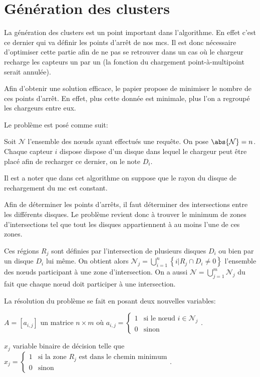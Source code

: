 \documentclass[final]{polytech/polytech}
\begin{document}
	\section{Génération des clusters\label{sec:clustering}}
		La génération des clusters est un point important dans l'algorithme.
		En effet c'est ce dernier qui va définir les points d'arrêt de nos \glspl{mc}.
		Il est donc nécessaire d'optimiser cette partie afin de ne pas se retrouver dans un cas où le chargeur recharge les capteurs un par un (la fonction du chargement point-à-multipoint serait annulée).
		
		Afin d'obtenir une solution efficace, le papier \cite{KHELLADI201744} propose de minimiser le nombre de ces points d'arrêt.
		 En effet, plus cette donnée est minimale, plus l'on a regroupé les chargeurs entre eux.
		 
		 Le problème est posé comme suit:
		 
		 Soit $\mathcal N$ l'ensemble des n\oe uds ayant effectués une requête. On pose $\abs{\mathcal N} = n$.
		 Chaque capteur $i$ dispose dispose d'un disque dans lequel le chargeur peut être placé afin de recharger ce dernier, on le note $D_i$.
		 
		 Il est a noter que dans cet algorithme on suppose que le rayon du disque de rechargement du \gls{mc} est constant.
		 
		 Afin de déterminer les points d'arrêts, il faut déterminer des intersections entre les différents disques.
		 Le problème revient donc à trouver le minimum de zones d'intersections tel que tout les disques appartiennent à au moins l'une de ces zones.
		 
		 Ces régions $R_j$ sont définies par l'intersection de plusieurs disques $D_i$ ou bien par un disque $D_i$ lui même.
		 On obtient alors $\mathcal N_j=\bigcup_{i=1}^n\left\{i|R_j\cap D_i\neq 0\right\}$ l'ensemble des n\oe uds participant à une zone d'intersection.
		 On a aussi $\mathcal N=\bigcup_{j=1}^m\mathcal N_j$ du fait que chaque n\oe ud doit participer à une intersection.
		 
		 La résolution du problème se fait en posant deux nouvelles variables:
		 
		 $A=\left[a_{i,j}\right]$ un matrice $n\times m$ où $a_{i,j}=\left\{\begin{array}{ll}
		 	1 & \text{si le n\oe ud } i \in \mathcal N_j\\
		 	0 & \text{sinon}
		 \end{array}\right.$.
		 
		 $x_j$ variable binaire de décision telle que $x_j=\left\{\begin{array}{ll}
		 	1 & \text{si la zone } R_j \text{ est dans le chemin minimum}\\
		 	0 & \text{sinon}
		 \end{array}\right.$.
		 
\end{document}
